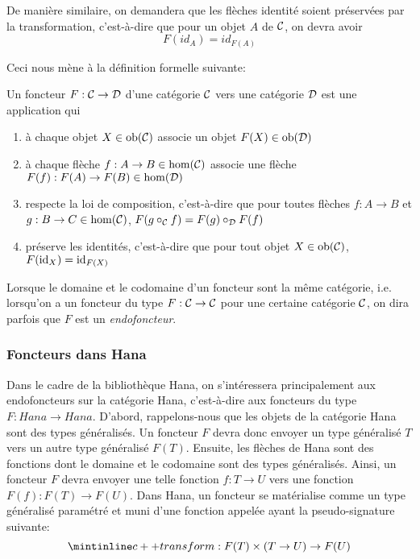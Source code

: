 De manière similaire, on demandera que les flèches identité soient préservées
par la transformation, c'est-à-dire que pour un objet $A$ de $\mathcal{C}$, on devra
avoir
\[
    F(id_A) = id_{F(A)}
\]

Ceci nous mène à la définition formelle suivante:

\begin{définition}[Foncteur]
    Un foncteur $F : \mathcal{C} \to \mathcal{D}$ d'une catégorie $\mathcal{C}$ vers une catégorie $\mathcal{D}$
    est une application qui
    \begin{enumerate}
        \item à chaque objet $X \in \mathrm{ob}(\mathcal{C})$ associe un objet $F(X) \in \mathrm{ob}(\mathcal{D})$
        \item à chaque flèche $f : A \to B \in \hom(\mathcal{C})$ associe une flèche
              $F(f) : F(A) \to F(B) \in \hom(\mathcal{D})$
        \item respecte la loi de composition, c'est-à-dire que pour toutes
              flèches $f : A \to B$ et $g : B \to C \in \hom(\mathcal{C})$,
              $F(g \circ_{\mathcal{C}} f) = F(g) \circ_{\mathcal{D}} F(f)$
        \item préserve les identités, c'est-à-dire que pour tout objet
              $X \in \mathrm{ob}(\mathcal{C})$, $F(\mathrm{id}_X) = \mathrm{id}_{F(X)}$
    \end{enumerate}
\end{définition}

Lorsque le domaine et le codomaine d'un foncteur sont la même catégorie, i.e.
lorsqu'on a un foncteur du type $F : \mathcal{C} \to \mathcal{C}$ pour une certaine catégorie
$\mathcal{C}$, on dira parfois que $F$ est un \textit{endofoncteur}.


\subsubsection{Foncteurs dans Hana}
Dans le cadre de la bibliothèque Hana, on s'intéressera principalement aux
endofoncteurs sur la catégorie Hana, c'est-à-dire aux foncteurs du type
$F : Hana \to Hana$. D'abord, rappelons-nous que les objets de la catégorie
Hana sont des types généralisés. Un foncteur $F$ devra donc envoyer un type
généralisé $T$ vers un autre type généralisé $F(T)$. Ensuite, les flèches de
Hana sont des fonctions dont le domaine et le codomaine sont des types
généralisés. Ainsi, un foncteur $F$ devra envoyer une telle fonction
$f : T \to U$ vers une fonction $F(f) : F(T) \to F(U)$. Dans Hana, un
foncteur se matérialise comme un type généralisé paramétré et muni d'une
fonction appelée  ayant la pseudo-signature suivante:
\[
    \icpp{transform} : F(T) \times (T \to U) \to F(U)
\]

